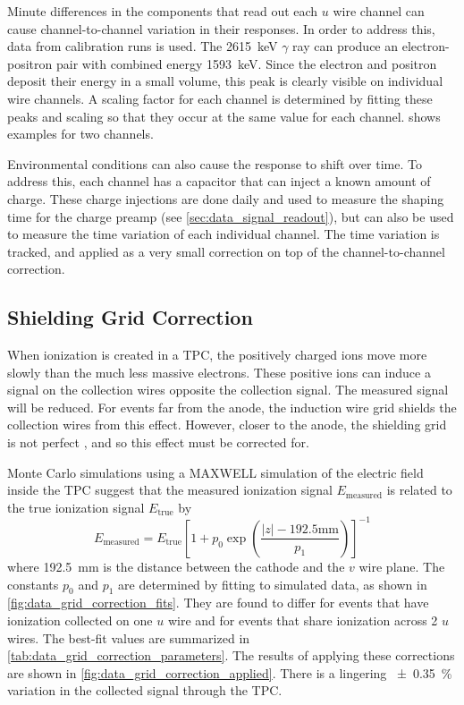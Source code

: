 \documentclass[herrin-thesis.tex]{subfiles}
\begin{document}
Minute differences in the components that read out each \(u\) wire channel can cause channel-to-channel variation in their responses. In order to address this, data from  calibration runs is used. The \SI{2615}{\keV} \(\gamma\) ray can produce an electron-positron pair with combined energy \SI{1593}{\keV}. Since the electron and positron deposit their energy in a small volume, this peak is clearly visible on individual wire channels. A scaling factor for each channel is determined by fitting these peaks and scaling so that they occur at the same value for each channel.  shows examples for two channels.

Environmental conditions can also cause the response to shift over time. To address this, each channel has a capacitor that can inject a known amount of charge. These charge injections are done \about{} daily and used to measure the shaping time for the charge preamp (see \cref{sec:data_signal_readout}), but can also be used to measure the time variation of each individual channel. The time variation is tracked, and applied as a very small correction on top of the channel-to-channel correction.

\subsection{Shielding Grid Correction}
\label{sec:data_grid_correction}
When ionization is created in a TPC, the positively charged ions move more slowly than the much less massive electrons. These positive ions can induce a signal on the collection wires opposite the collection signal. The measured signal will be reduced. For events far from the anode, the induction wire grid shields the collection wires from this effect. However, closer to the anode, the shielding grid is not perfect \cite{Bunemann:1949kx}, and so this effect must be corrected for.

Monte Carlo simulations using a MAXWELL simulation of the electric field inside the TPC suggest that the measured ionization signal \(E_\text{measured}\) is related to the true ionization signal \(E_\text{true}\) by
\begin{equation}
E_\text{measured} = E_\text{true}\left[1 + p_0 \exp \left(\frac{|z| - 192.5\si{\mm}}{p_1}\right)\right]^{-1}
\label{eq:data_grid_correction}
\end{equation}
where \SI{192.5}{\mm} is the distance between the cathode and the \(v\) wire plane. The constants \(p_0\) and \(p_1\) are determined by fitting to simulated data, as shown in \cref{fig:data_grid_correction_fits}. They are found to differ for events that have ionization collected on one \(u\) wire and for events that share ionization across 2 \(u\) wires. The best-fit values are summarized in \cref{tab:data_grid_correction_parameters}. The results of applying these corrections are shown in \cref{fig:data_grid_correction_applied}. There is a lingering \SI{\pm0.35}{\percent} variation in the collected signal through the TPC.
\end{document}
